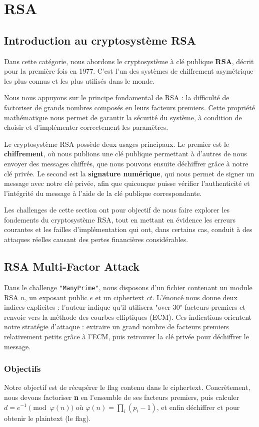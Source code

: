 
\section{RSA}
\subsection{Introduction au cryptosystème RSA}
Dans cette catégorie, nous abordons le cryptosystème à clé publique \textbf{RSA}, décrit pour la première fois en 1977. C’est l’un des systèmes de chiffrement asymétrique les plus connus et les plus utilisés dans le monde.

Nous nous appuyons sur le principe fondamental de RSA : la difficulté de factoriser de grands nombres composés en leurs facteurs premiers. Cette propriété mathématique nous permet de garantir la sécurité du système, à condition de choisir et d’implémenter correctement les paramètres.

Le cryptosystème RSA possède deux usages principaux. Le premier est le \textbf{chiffrement}, où nous publions une clé publique permettant à d’autres de nous envoyer des messages chiffrés, que nous pouvons ensuite déchiffrer grâce à notre clé privée. Le second est la \textbf{signature numérique}, qui nous permet de signer un message avec notre clé privée, afin que quiconque puisse vérifier l’authenticité et l’intégrité du message à l’aide de la clé publique correspondante.

Les challenges de cette section ont pour objectif de nous faire explorer les fondements du cryptosystème RSA, tout en mettant en évidence les erreurs courantes et les failles d’implémentation qui ont, dans certains cas, conduit à des attaques réelles causant des pertes financières considérables.


\subsection{RSA Multi-Factor Attack}
Dans le challenge \texttt{"ManyPrime"}, nous disposons d’un fichier contenant un module RSA $n$, un exposant public $e$ et un ciphertext $ct$. L’énoncé nous donne deux indices explicites : l’auteur indique qu’il utilisera "over 30" facteurs premiers et renvoie vers la méthode des courbes elliptiques (ECM). Ces indications orientent notre stratégie d’attaque : extraire un grand nombre de facteurs premiers relativement petits grâce à l’ECM, puis retrouver la clé privée pour déchiffrer le message.


\subsubsection{Objectifs}
Notre objectif est de récupérer le flag contenu dans le ciphertext. Concrètement, nous devons factoriser \textbf{n} en l’ensemble de ses facteurs premiers, puis calculer $d = e^{-1} \pmod{\varphi(n)}$ où $\varphi(n)=\prod_i (p_i-1)$, et enfin déchiffrer $\mathrm{ct}$ pour obtenir le plaintext (le flag).


